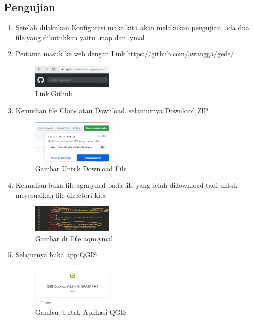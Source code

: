 \begin{enumerate}
\subsection{Pengujian}
\begin{enumerate}
	\item Setelah dilakukan Konfigurasi maka kita akan melakukan pengujian, ada dua file yang dibutuhkan yaitu .map dan .ymal
  \item Pertama masuk ke web dengan Link https://github.com/awangga/gede/

 \hfill\break
  \begin{figure}[H]
  \includegraphics[width=4cm]{figures/tugas4/1174062/8.png}
  \centering
  \caption{Link Github}
  \end{figure}


  \item Kemudian file Clone atau Download, selanjutnya Download ZIP
  
    \hfill\break
    \begin{figure}[H]
  \includegraphics[width=4cm]{figures/tugas4/1174062/9.png}
  \centering
  \caption{Gambar Untuk Download File}
  \end{figure}

  \item Kemudian buka file agm.ymal  pada file yang telah didownload tadi untuk meyesuaikan file directori kita
    
    \hfill\break
    \begin{figure}[H]
  \includegraphics[width=4cm]{figures/tugas4/1174062/10.png}
  \centering
  \caption{Gambar di File aqm.ymal}
  \end{figure}
  
   \item Selajutnya buka app QGIS
  
 \hfill\break
    \begin{figure}[H]
  \includegraphics[width=4cm]{figures/tugas4/1174062/11.png}
  \centering
  \caption{Gambar Untuk Aplikasi QGIS}
  \end{figure}
  

\end{enumerate}
\end{enumerate}
